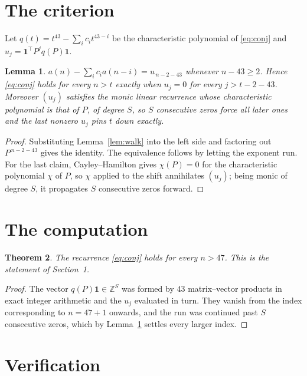 \documentclass[11pt,a4paper]{article}
\theoremstyle{plain}
\newtheorem{theorem}{Theorem}
\newtheorem{lemma}[theorem]{Lemma}
\theoremstyle{definition}
\begin{document}
\section{The criterion}

Let $q(t)=t^{43}-\sum_i c_i t^{43-i}$ be the characteristic polynomial of
\eqref{eq:conj} and $u_j=\mathbf{1}^{\!\top}P^{j}q(P)\mathbf{1}$.

\begin{lemma}\label{lem:crit}
$a(n)-\sum_i c_i a(n-i)=u_{\,n-2-43}$ whenever $n-43\ge2$. Hence
\eqref{eq:conj} holds for every $n>t$ exactly when $u_j=0$ for every
$j>t-2-43$. Moreover $(u_j)$ satisfies the monic linear recurrence whose
characteristic polynomial is that of $P$, of degree $S$, so $S$ consecutive zeros force all
later ones and the last nonzero $u_j$ pins $t$ down exactly.
\end{lemma}

\begin{proof}
Substituting Lemma~\ref{lem:walk} into the left side and factoring out
$P^{\,n-2-43}$ gives the identity. The equivalence follows by letting the exponent
run. For the last claim, Cayley--Hamilton gives $\chi(P)=0$ for the characteristic
polynomial $\chi$ of $P$, so $\chi$ applied to the shift annihilates $(u_j)$; being monic of
degree $S$, it propagates $S$ consecutive zeros forward.
\end{proof}

\section{The computation}

\begin{theorem}
The recurrence \eqref{eq:conj} holds for every $n>47$. This is the statement of
Section~1.
\end{theorem}

\begin{proof}
The vector $q(P)\mathbf{1}\in\mathbb{Z}^{S}$ was formed by $43$ matrix--vector
products in exact integer arithmetic and the $u_j$ evaluated in turn. They vanish from the
index corresponding to $n=47+1$ onwards, and the run was continued past $S$ consecutive
zeros, which by Lemma~\ref{lem:crit} settles every larger index.
\end{proof}

\section{Verification}
\end{document}
